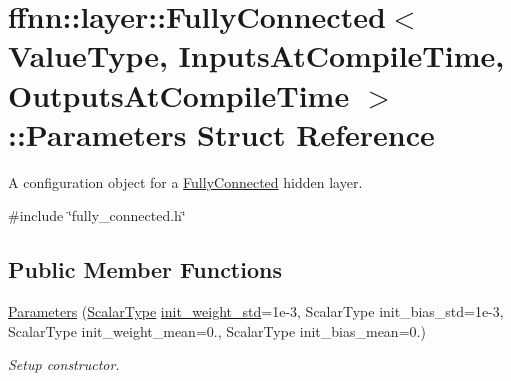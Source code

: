 \hypertarget{structffnn_1_1layer_1_1_fully_connected_1_1_parameters}{\section{ffnn\-:\-:layer\-:\-:Fully\-Connected$<$ Value\-Type, Inputs\-At\-Compile\-Time, Outputs\-At\-Compile\-Time $>$\-:\-:Parameters Struct Reference}
\label{structffnn_1_1layer_1_1_fully_connected_1_1_parameters}
}


A configuration object for a \hyperlink{classffnn_1_1layer_1_1_fully_connected}{Fully\-Connected} hidden layer.  




{\ttfamily \#include \char`\"{}fully\-\_\-connected.\-h\char`\"{}}

\subsection*{Public Member Functions}
\begin{DoxyCompactItemize}
\item 
\hyperlink{structffnn_1_1layer_1_1_fully_connected_1_1_parameters_a21afd0086997bd7e911244e3883ca475}{Parameters} (\hyperlink{classffnn_1_1layer_1_1_fully_connected_ac3ff6f72846f84f89c0d6e10f138c7e3}{Scalar\-Type} \hyperlink{structffnn_1_1layer_1_1_fully_connected_1_1_parameters_af6ab8d97825d77b4cc2d6b4a4870759d}{init\-\_\-weight\-\_\-std}=1e-\/3, Scalar\-Type init\-\_\-bias\-\_\-std=1e-\/3, Scalar\-Type init\-\_\-weight\-\_\-mean=0., Scalar\-Type init\-\_\-bias\-\_\-mean=0.)
\begin{DoxyCompactList}\small\item\em Setup constructor. \end{DoxyCompactList}\end{DoxyCompactItemize}
